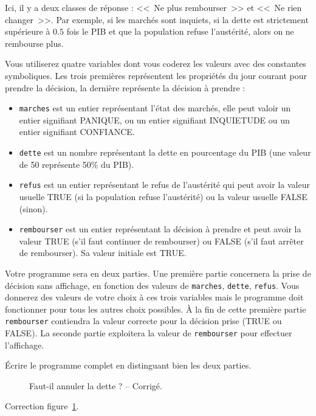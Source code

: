 Ici, il y a deux classes de réponse : <<~Ne plus rembourser~>> et
<<~Ne rien changer~>>.
Par exemple, si les marchés sont inquiets, si la dette est
strictement supérieure à $0.5$ fois le PIB et que la population refuse
l'austérité, alors on ne rembourse plus.


Vous utiliserez quatre variables dont vous coderez les valeurs avec des
constantes symboliques. Les trois premières représentent les propriétés du jour
courant pour prendre la décision, la dernière représente la décision à
prendre :
  
\begin{itemize}
\item \verb|marches| est un entier représentant l'état des marchés,
  elle peut valoir un entier signifiant PANIQUE, ou un entier
  signifiant INQUIETUDE ou un entier signifiant CONFIANCE.
\item \verb|dette| est un nombre représentant la dette en
  pourcentage du PIB (une valeur de 50 représente 50\% du PIB).
\item \verb|refus| est un entier représentant le refus de l'austérité
  qui peut avoir la valeur usuelle
 TRUE (si la population refuse l'austérité) ou la valeur usuelle FALSE (sinon).
\item \verb|rembourser| est un entier représentant la décision à
  prendre et peut avoir la valeur TRUE (s'il faut continuer de
  rembourser) ou FALSE (s'il faut arrêter de rembourser). Sa valeur
  initiale est TRUE. 
\end{itemize}

Votre programme sera en deux parties. Une première partie concernera
la prise de décision sans affichage, en fonction
des valeurs de \verb|marches|, \verb|dette|, \verb|refus|. Vous
donnerez des valeurs de votre choix à ces trois variables mais le
programme doit fonctionner pour tous les autres choix possibles. À la fin
de cette première partie \verb|rembourser| contiendra la valeur
correcte pour la décision prise (TRUE ou FALSE). La seconde partie
exploitera la valeur de \verb|rembourser| pour effectuer l'affichage.

\question
Écrire le programme complet en distinguant bien les deux
parties.

\begin{correction}
\begin{figure}
  \centering
\begin{small}
\end{small} 
  \caption{Faut-il annuler la dette ? -- Corrigé.}
  \label{fig:dropdebt}
\end{figure}
Correction figure~\ref{fig:dropdebt}.
\end{correction}


